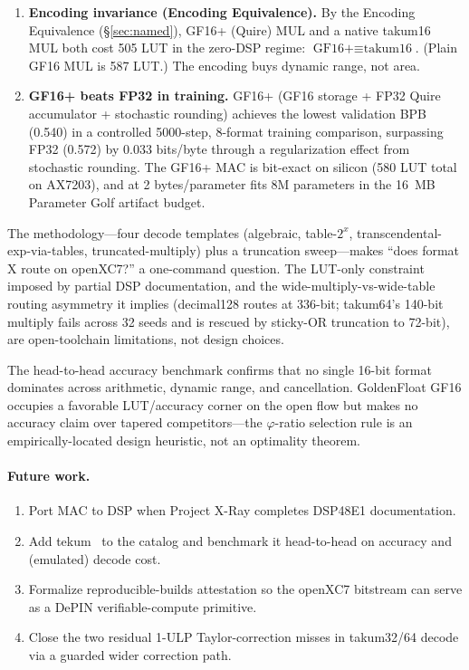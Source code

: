 \documentclass[11pt]{article}
\begin{document}
\begin{enumerate}[label=\textbf{F\arabic*.},leftmargin=*]
\item \textbf{Encoding invariance (Encoding Equivalence).} By the Encoding
   Equivalence (\S\ref{sec:named}), GF16+ (Quire) MUL and a native takum16 MUL
   both cost 505 LUT in the zero-DSP regime: $\text{GF16+} \equiv \text{takum16}$.
   (Plain GF16 MUL is 587 LUT.)
   The encoding buys dynamic range, not area.

\item \textbf{GF16+ beats FP32 in training.} GF16+ (GF16 storage + FP32
   Quire accumulator + stochastic rounding) achieves the lowest validation
   BPB (0.540) in a controlled 5000-step, 8-format training comparison,
   surpassing FP32 (0.572) by 0.033 bits/byte through a regularization
   effect from stochastic rounding. The GF16+ MAC is bit-exact on silicon
   (580 LUT total on AX7203), and at 2 bytes/parameter fits 8M parameters
   in the 16~MB Parameter Golf artifact budget.
\end{enumerate}

The methodology---four decode templates (algebraic, table-$2^{x}$,
transcendental-exp-via-tables, truncated-multiply) plus a truncation sweep---makes
``does format X route on openXC7?'' a one-command question. The LUT-only
constraint imposed by partial DSP documentation, and the wide-multiply-vs-wide-table
routing asymmetry it implies (decimal128 routes at 336-bit; takum64's 140-bit
multiply fails across 32 seeds and is rescued by sticky-OR truncation to 72-bit),
are open-toolchain limitations, not design choices.

The head-to-head accuracy benchmark confirms that no single 16-bit format
dominates across arithmetic, dynamic range, and cancellation. GoldenFloat GF16
occupies a favorable LUT/accuracy corner on the open flow but makes no accuracy
claim over tapered competitors---the $\varphi$-ratio selection rule is an
empirically-located design heuristic, not an optimality theorem.

\paragraph{Future work.}
\begin{enumerate}[label=(\roman*),leftmargin=*]
\item Port MAC to DSP when Project X-Ray completes DSP48E1 documentation.
\item Add tekum~\cite{hunhold2025tekum} to the catalog and benchmark it
  head-to-head on accuracy and (emulated) decode cost.
\item Formalize reproducible-builds attestation so the openXC7 bitstream can
  serve as a DePIN verifiable-compute primitive.
\item Close the two residual 1-ULP Taylor-correction misses in takum32/64 decode
  via a guarded wider correction path.
\end{enumerate}
\end{document}
